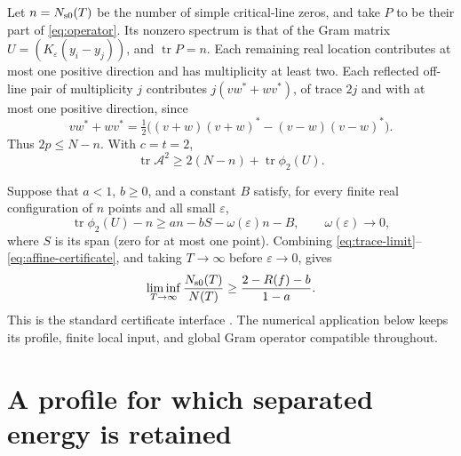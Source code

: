 \documentclass[11pt,reqno]{amsart}
\numberwithin{equation}{section}
\newcommand{\tr}{\operatorname{tr}}
\newcommand{\Nsc}{N_{\rm s0}}
\begin{document}
Let $n=\Nsc(T)$ be the number of simple critical-line zeros, and take
$P$ to be their part of \eqref{eq:operator}. Its nonzero spectrum is
that of the Gram matrix $U=(K_\varepsilon(y_i-y_j))$, and $\tr P=n$.
Each remaining real location contributes at most one positive direction
and has multiplicity at least two. Each reflected off-line pair of
multiplicity $j$ contributes $j(vw^*+wv^*)$, of trace $2j$ and with
at most one positive direction, since
\[
 vw^*+wv^*=\tfrac12\bigl((v+w)(v+w)^*-(v-w)(v-w)^*\bigr).
\]
Thus $2p\le N-n$. With $c=t=2$,
\begin{equation}
 \tr\mathcal A^2\ge2(N-n)+\tr\phi_2(U).
 \label{eq:simple-master}
\end{equation}

Suppose that $a<1$, $b\ge0$, and a constant $B$ satisfy, for every
finite real configuration of $n$ points and all small $\varepsilon$,
\begin{equation}
 \tr\phi_2(U)-n\ge an-bS-\omega(\varepsilon)n-B,
 \qquad\omega(\varepsilon)\longrightarrow0,
 \label{eq:affine-certificate}
\end{equation}
where $S$ is its span (zero for at most one point). Combining
\eqref{eq:trace-limit}--\eqref{eq:affine-certificate}, and taking
$T\to\infty$ before $\varepsilon\to0$, gives
\begin{equation}
 \liminf_{T\to\infty}\frac{\Nsc(T)}{N(T)}
 \ge\frac{2-R(f)-b}{1-a}.
 \label{eq:simple-quotient}
\end{equation}
This is the standard certificate interface
\cite{AF,Lamzouri,ChandruP6,Knausgard2026}. The numerical application below keeps its profile, finite local input,
and global Gram operator compatible throughout.

\section{A profile for which separated energy is retained}
\label{sec:am-profile}
\end{document}
